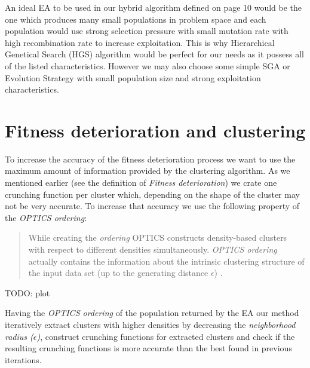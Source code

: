 An ideal EA to be used in our hybrid algorithm defined on page 10
would be the one which produces many small populations in problem space and
each population would use strong selection pressure with small mutation rate
with high recombination rate to increase exploitation. This is why Hierarchical 
Genetical Search (HGS) algorithm would be perfect for our needs as it possess
all of the listed characteristics. However we may also choose some simple 
SGA or Evolution Strategy with small population size and strong exploitation
characteristics.
 

\section{Fitness deterioration and clustering}

To increase the accuracy of the fitness deterioration process 
we want to use the maximum amount of information provided by the clustering
algorithm. As we mentioned earlier (see the definition of \textit{Fitness
deterioration}) we crate one crunching function per cluster which, depending
on the shape of the cluster may not be very accurate. To increase that accuracy
we use the following property of the \textit{OPTICS ordering}:
\begin{quotation}
While creating the \textit{ordering} OPTICS constructs density-based clusters
with respect to different densities simultaneously. \textit{OPTICS ordering}
actually contains the information about the intrinsic clustering structure of
the input data set (up to the generating distance $\epsilon$) \cite{optics}.
\end{quotation}

TODO: plot

Having the \textit{OPTICS ordering} of the population returned by the EA our
method iteratively extract clusters with higher densities by decreasing 
the \textit{neighborhood radius ($\epsilon$)}, construct crunching functions
for extracted clusters and check if the resulting crunching functions 
is more accurate than the best found in previous iterations. 

\begin{algorithmic}[1]
	\ENDIF
\ENDWHILE
\end{algorithmic}

